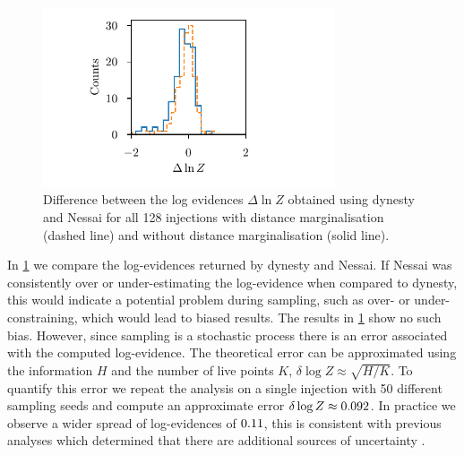 \documentclass[%
 reprint,
nofootinbib,
 amsmath,amssymb,
 aps,
 prd,
]{revtex4-2}
\newcommand{\nessai}{{\sc Nessai}\xspace}
\newcommand{\dynesty}{{\sc dynesty}\xspace}
\newcommand{\figwidth}{8.6cm}
\begin{document}
\begin{figure}
    \centering
    \includegraphics[width=\figwidth]{figures/log_evidence_difference.pdf}
    \caption{Difference between the log evidences $\Delta \ln Z$ obtained using \dynesty and \nessai for all 128 injections with distance marginalisation (dashed line) and without distance marginalisation (solid line).}
    \label{fig:log_evidence}
\end{figure}

In \cref{fig:log_evidence} we compare the log-evidences returned by \dynesty and \nessai. If \nessai was consistently over or under-estimating the log-evidence when compared to \dynesty, this would indicate a potential problem during sampling, such as over- or under-constraining, which would lead to biased results. The results in \cref{fig:log_evidence} show no such bias. However, since sampling is a stochastic process there is an error associated with the computed log-evidence. The theoretical error can be approximated using the information $H$ and the number of live points $K$, $\delta \log Z \approx \sqrt{H / K}$. To quantify this error we repeat the analysis on a single injection with 50 different sampling seeds and compute an approximate error $\delta \log Z \approx 0.092$. In practice we observe a wider spread of log-evidences of $0.11$, this is consistent with previous analyses which determined that there are additional sources of uncertainty \cite{Veitch:2010ns}.

\end{document}
